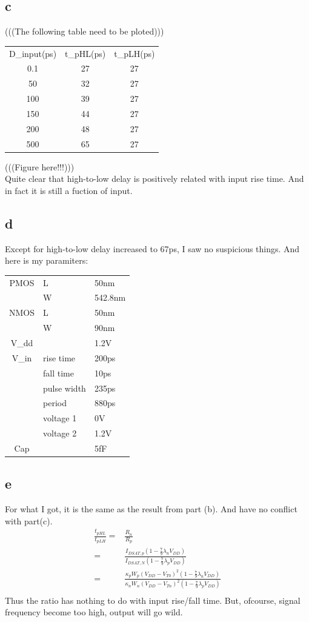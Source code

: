\documentclass[a4paper,10pt]{article}
\begin{document}
\subsection*{c}
(((The following table need to be ploted)))\\
\begin{tabular}{c c c}
 D\_input(ps)	&	t\_pHL(ps)	&	t\_pLH(ps)\\
 0.1		&	27		&	27\\
 50		&	32		&	27\\
 100		&	39		&	27\\
 150		&	44		&	27\\
 200		&	48		&	27\\
 500		&	65		&	27\\
\end{tabular}
(((Figure here!!!)))\\
Quite clear that high-to-low delay is positively related with input rise time. And in fact it is still a fuction of input.
\subsection*{d}
Except for high-to-low delay increased to 67ps, I saw no suspicious things. And here is my paramiters:\\
\begin{tabular}{c l l}
 PMOS	&	L	&	50nm\\
	&	W	&	542.8nm\\
 NMOS	&	L	&	50nm\\
	&	W	&	90nm\\
 V\_dd	&		&	1.2V\\
 V\_in	&	rise time	&	200ps\\
	&	fall time	&	10ps\\
	&	pulse width	&	235ps\\
	&	period	&	880ps\\
	&	voltage 1	&	0V\\
	&	voltage 2	&	1.2V\\
 Cap	&		&	5fF\\
\end{tabular}
\subsection*{e}
For what I got, it is the same as the result from part (b). And have no conflict with part(c).
\begin{equation}
 \begin{split}
  \frac{t_{pHL}}{t_{pLH}} =& \frac{R_n}{R_p}\\
  =& \frac{I_{DSAT, p}(1-\frac{7}{9}\lambda_n V_{DD})}{I_{DSAT, N}(1-\frac{7}{9}\lambda_p V_{DD})}\\
  =& \frac{\kappa_p W_p (V_{DD} - V_{T0})^2 (1-\frac{7}{9}\lambda_n V_{DD})}{\kappa_n W_n (V_{DD} - V_{Tn})^2 (1-\frac{7}{9}\lambda_p V_{DD})}\\
 \end{split}
\end{equation}
Thus the ratio has nothing to do with input rise/fall time. But, ofcourse, signal frequency become too high, output will go
wild.
\end{document}
